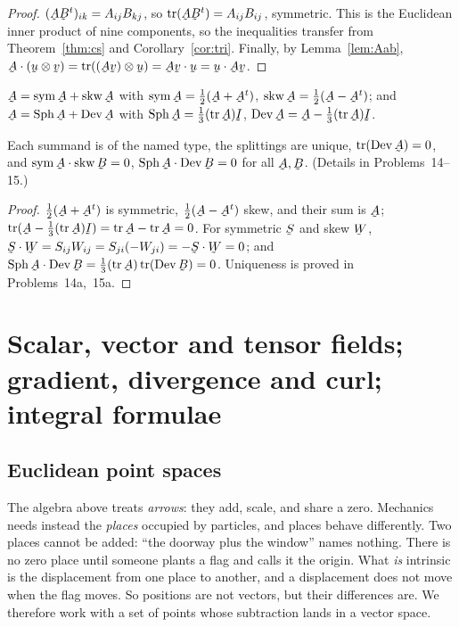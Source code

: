 \begin{proof}
$(\bA\bB^{t})_{ik}=A_{ij}B_{kj}$, so $\tr(\bA\bB^{t})=A_{ij}B_{ij}$,
symmetric. This is the Euclidean inner product of nine components, so the
inequalities transfer from Theorem~\ref{thm:cs} and
Corollary~\ref{cor:tri}. Finally, by Lemma~\ref{lem:Aab},
$\bA\cdot(\bu\otimes\bv)=\tr((\bA\bv)\otimes\bu)=\ip{\bA\bv}\bu
=\ip\bu{\bA\bv}$.
\end{proof}

\begin{definition}\label{def:splits}
$\bA=\Sym\bA+\Skw\bA$ with $\Sym\bA=\tfrac12(\bA+\bA^{t})$,
$\Skw\bA=\tfrac12(\bA-\bA^{t})$; and
$\bA=\Sph\bA+\Dev\bA$ with $\Sph\bA=\tfrac13(\tr\bA)\I$,
$\Dev\bA=\bA-\tfrac13(\tr\bA)\I$.
\end{definition}

\begin{proposition}\label{prop:splits}
Each summand is of the named type, the splittings are unique,
$\tr(\Dev\bA)=0$, and $\Sym\bA\cdot\Skw\bB=0$,
$\Sph\bA\cdot\Dev\bB=0$ for all $\bA,\bB$. (Details in Problems~14--15.)
\end{proposition}

\begin{proof}
$\tfrac12(\bA+\bA^t)$ is symmetric, $\tfrac12(\bA-\bA^t)$ skew, and their
sum is $\bA$; $\tr(\bA-\tfrac13(\tr\bA)\I)=\tr\bA-\tr\bA=0$. For symmetric
$\bS$ and skew $\bW$, $\bS\cdot\bW=S_{ij}W_{ij}=S_{ji}(-W_{ji})
=-\bS\cdot\bW=0$; and
$\Sph\bA\cdot\Dev\bB=\tfrac13(\tr\bA)\tr(\Dev\bB)=0$. Uniqueness is proved
in Problems~14a,~15a.
\end{proof}

\section{Scalar, vector and tensor fields; gradient, divergence and curl;
integral formulae}\label{sec:fields}

\subsection{Euclidean point spaces}\label{ss:pts}

The algebra above treats \emph{arrows}: they add, scale, and share a zero.
Mechanics needs instead the \emph{places} occupied by particles, and places
behave differently. Two places cannot be added: ``the doorway plus the
window'' names nothing. There is no zero place until someone plants a flag
and calls it the origin. What \emph{is} intrinsic is the displacement from
one place to another, and a displacement does not move when the flag moves.
So positions are not vectors, but their differences are. We therefore work
with a set of points whose subtraction lands in a vector space.

